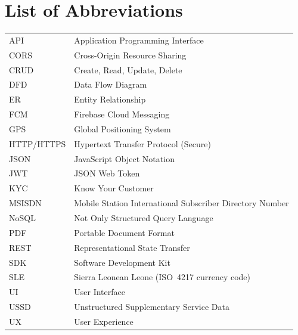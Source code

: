 \chapter*{List of Abbreviations}

\begin{tabular}{@{}p{3.2cm}p{10.5cm}@{}}
API & Application Programming Interface \\
CORS & Cross-Origin Resource Sharing \\
CRUD & Create, Read, Update, Delete \\
DFD & Data Flow Diagram \\
ER & Entity Relationship \\
FCM & Firebase Cloud Messaging \\
GPS & Global Positioning System \\
HTTP/HTTPS & Hypertext Transfer Protocol (Secure) \\
JSON & JavaScript Object Notation \\
JWT & JSON Web Token \\
KYC & Know Your Customer \\
MSISDN & Mobile Station International Subscriber Directory Number \\
NoSQL & Not Only Structured Query Language \\
PDF & Portable Document Format \\
REST & Representational State Transfer \\
SDK & Software Development Kit \\
SLE & Sierra Leonean Leone (ISO~4217 currency code) \\
UI & User Interface \\
USSD & Unstructured Supplementary Service Data \\
UX & User Experience \\
\end{tabular}
